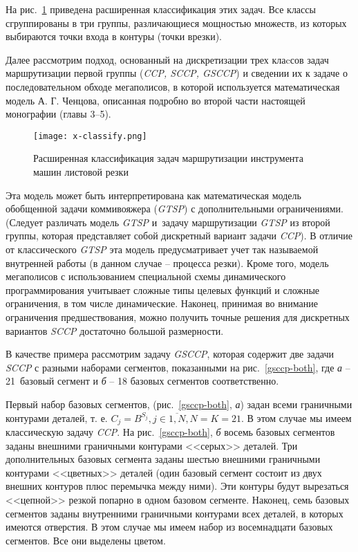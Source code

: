 На рис.~\ref{x-classify}
приведена расширенная классификация этих задач.
Все классы сгруппированы в три группы,
различающиеся мощностью множеств,
из которых выбираются точки входа в контуры
(точки врезки).

Далее рассмотрим подход,
основанный на  дискретизации трех клаcсов задач маршрутизации
первой группы ({\it CCP, SCCP, GSCCP})
и сведении их к задаче о последовательном обходе мегаполисов,
в которой  используется математическая модель А. Г. Ченцова,
описанная подробно во второй части настоящей монографии
(главы 3--5).

\begin{figure}[H]
  \centering
  \texttt{[image: x-classify.png]}
  \caption{
    Расширенная классификация задач
    маршрутизации инструмента машин листовой резки
  }
  \label{x-classify}
\end{figure}

Эта модель может быть интерпретирована
как математическая модель обобщенной задачи коммивояжера ({\it GTSP})
с дополнительными ограничениями.
(Следует различать модель {\it GTSP}
и~задачу маршрутизации {\it GTSP} из второй группы,
которая представляет собой дискретный вариант задачи {\it CCP}).
В отличие от классического {\it GTSP} эта модель
предусматривает учет так называемой внутренней работы
(в данном случае -- процесса резки).
Кроме того, модель мегаполисов с
использованием специальной схемы динамического программирования
учитывает сложные типы целевых функций и сложные ограничения,
в том числе динамические.
Наконец, принимая во внимание ограничения предшествования,
можно получить точные решения для дискретных вариантов {\it SCCP}
достаточно большой размерности.

В качестве примера рассмотрим задачу {\it GSCCP},
которая содержит две
задачи {\it SCCP} с разными наборами сегментов,
показанными на рис.~\ref{gsccp-both},
где {\it а} -- 21~базовый сегмент
и {\it б} -- 18 базовых сегментов соответственно.

Первый набор базовых сегментов,
(рис.~\ref{gsccp-both}, {\it а})
задан всеми граничными контурами деталей, т. е.
$C_j = B^{S_j}, j\in\overline{1,N}, N=K=21$.
В этом случае мы имеем классическую задачу {\it CCP}.
На рис.~\ref{gsccp-both}, {\it б} восемь
базовых сегментов заданы внешними граничными контурами <<серых>> деталей.
Три дополнительных базовых сегмента заданы шестью
внешними граничными контурами <<цветных>> деталей
(один базовый сегмент состоит из двух внешних контуров плюс перемычка между ними).
Эти контуры будут вырезаться <<цепной>> резкой попарно в одном базовом сегменте.
Наконец, семь базовых сегментов заданы внутренними
граничными контурами всех деталей,
в которых имеются отверстия.
В этом случае мы имеем набор из восемнадцати
базовых сегментов.
Все они выделены цветом.

